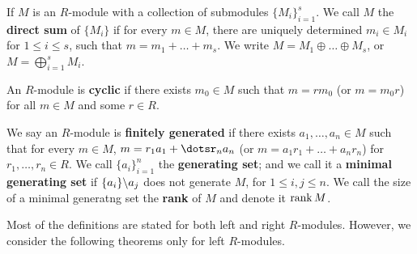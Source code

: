 \begin{definition}
    If $M$ is an  $R$-module with a collection of submodules $\{M_i\}_{i=1}^s$. We call $M$ the
    \textbf{direct sum} of $\{M_i\}$ if for every $m \in M$, there are uniquely determined  $m_i \in
    M_i$ for  $1 \leq i \leq s$, such that  $m=m_1+\dots+m_s$. We write $M=M_1 \oplus \dots \oplus
    M_s$, or $M=\bigoplus_{i=1}^s{M_i}$.
\end{definition}

\begin{definition}
    An $R$-module is \textbf{cyclic} if there exists $m_0 \in M$ such that $m=rm_0$ (or $m=m_0r$)
    for all $m \in M$ and some  $r \in R$.
\end{definition}

\begin{definition}
    We say an $R$-module is  \textbf{finitely generated} if there exists $a_1,\dots ,a_n \in M$ such
    that for every $m \in M$,  $m=r_1a_1+\dotsr_na_n$ (or $m=a_1r_1+\dots+a_nr_n$) for $r_1, \dots,
    r_n \in R$. We call $\{a_i\}_{i=1}^n$ the \textbf{generating set}; and we call it a
    \textbf{minimal generating set} if $\{a_i\} \backslash a_j$ does not generate $M$, for  $1 \leq i,j
    \leq n$. We call the size of a minimal generatng set the  \textbf{rank} of $M$ and denote it
    $\rank{M}$.
\end{definition}

Most of the definitions are stated for both left and right $R$-modules. However, we consider the
following theorems only for left $R$-modules.

